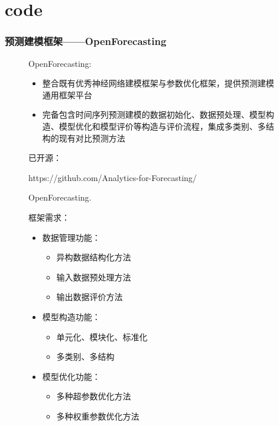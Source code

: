 \section{code}

\begin{frame}
    \frametitle{预测建模框架——OpenForecasting}


    \begin{figure}
        \begin{minipage}[t]{0.58\textwidth}
            OpenForecasting:
            \begin{itemize}
                \item 整合既有优秀神经网络建模框架与参数优化框架，提供预测建模通用框架平台
                \item 完备包含时间序列预测建模的数据初始化、数据预处理、模型构造、模型优化和模型评价等构造与评价流程，集成多类别、多结构的现有对比预测方法
            \end{itemize}

            \vspace{1em}
            已开源：
            
            https://github.com/Analytics-for-Forecasting/
            
            OpenForecasting.
        \end{minipage}
        \hfill
        \begin{minipage}[t]{0.4\textwidth}
            框架需求：
    \begin{itemize}
        \item 数据管理功能：
        \begin{itemize}
            \item 异构数据结构化方法
            \item 输入数据预处理方法
            \item 输出数据评价方法
        \end{itemize}
    \end{itemize}

    \begin{itemize}
        \item 模型构造功能：
        \begin{itemize}
            \item 单元化、模块化、标准化
            \item 多类别、多结构
        \end{itemize}
    \end{itemize}
    
    \begin{itemize}
        \item 模型优化功能：
        \begin{itemize}
            \item 多种超参数优化方法
            \item 多种权重参数优化方法
        \end{itemize}
    \end{itemize}
        \end{minipage}
    \end{figure}

\end{frame}

